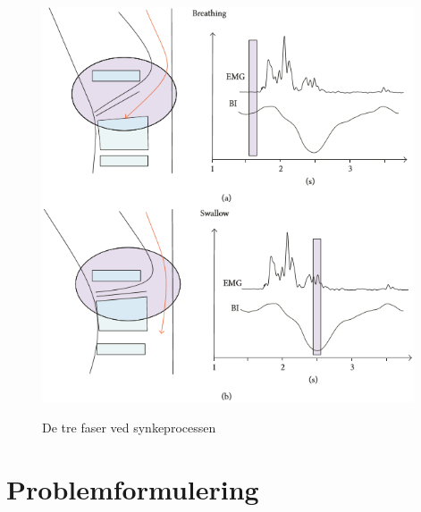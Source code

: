 \begin{figure}[H]
\centering
{\includegraphics[width=11cm]
{Figure/EMGBIGraph}}
\caption{De tre faser ved synkeprocessen\cite{Bass1992Dysphagia:Management}}
\label{trefaser}
\end{figure}




\section{Problemformulering}